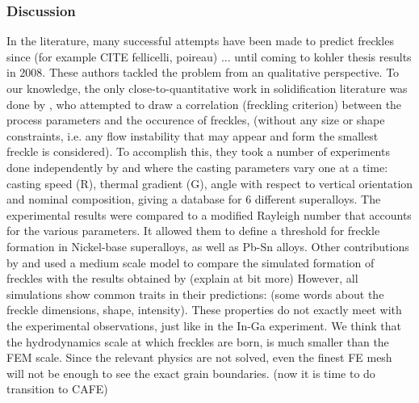 \subsubsection{Discussion}
In the literature, many successful attempts have been made to predict freckles since (for example CITE fellicelli, poireau) ... until coming to kohler thesis results in 2008. These authors tackled the problem from an qualitative perspective. To our knowledge, the only close-to-quantitative work in solidification literature was done by \citet{ramirez_evaluation_2003}, who attempted to draw a correlation (freckling criterion) between the process parameters and the occurence of freckles, (without any size or shape constraints, i.e. any flow instability that may appear and form the smallest freckle is considered). To accomplish this, they took a number of experiments done independently by \citet{pollock_1996} and \citet{auburtin_freckle_2000} where the casting parameters vary one at a time: casting speed (R), thermal gradient (G), angle with respect to vertical orientation and nominal composition, giving a database for 6 different superalloys. The experimental results were compared to a modified Rayleigh number that accounts for the various parameters. It allowed them to define a threshold for freckle formation in Nickel-base superalloys, as well as Pb-Sn alloys.
Other contributions by \citet{yuan_new_2012} and  \citet{karagadde_3-d_2014} used a medium scale model to compare the simulated formation of freckles with the results obtained by \citet{shevchenko_chimney_2013} (explain at bit more)
However, all simulations show common traits in their predictions: (some words about the freckle dimensions, shape, intensity). These properties do not exactly meet with the experimental observations, just like in the In-Ga experiment. We think that the hydrodynamics scale 
at which freckles are born, is much smaller than the FEM scale. Since the relevant physics are not solved, even the finest FE mesh will not
be enough to see the exact grain boundaries. (now it is time to do transition to CAFE)




















